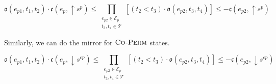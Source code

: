 \begin{theorem}
    \begin{equation}
        \mathfrak{o}(e_{p1}, t_1, t_2) \cdot \mathfrak{c}(e_p, \uparrow s^{p}) \leq 
        \prod_{\substack{e_{p2} \in \mathcal{E}_p \\ t_3, t_4 \in \mathcal{T}}}[(t_2 < t_3) \cdot \mathfrak{o}(e_{p2}, t_3, t_4) ]
        \leq - \mathfrak{c}(e_{p2}, \uparrow s^{p})
    \end{equation}
\end{theorem}

Similarly, we can do the mirror for $\textsc{Co-Perm}$ states.

\begin{theorem}
    \begin{equation}
        \mathfrak{o}(e_{p1}, t_1, t_2) \cdot \mathfrak{c}(e_p, \downarrow s^{cp}) \leq 
        \prod_{\substack{e_{p2} \in \mathcal{E}_p \\ t_3, t_4 \in \mathcal{T}}}[(t_2 < t_3) \cdot \mathfrak{o}(e_{p2}, t_3, t_4) ]
        \leq - \mathfrak{c}(e_{p2}, \downarrow s^{cp})
    \end{equation}
\end{theorem}